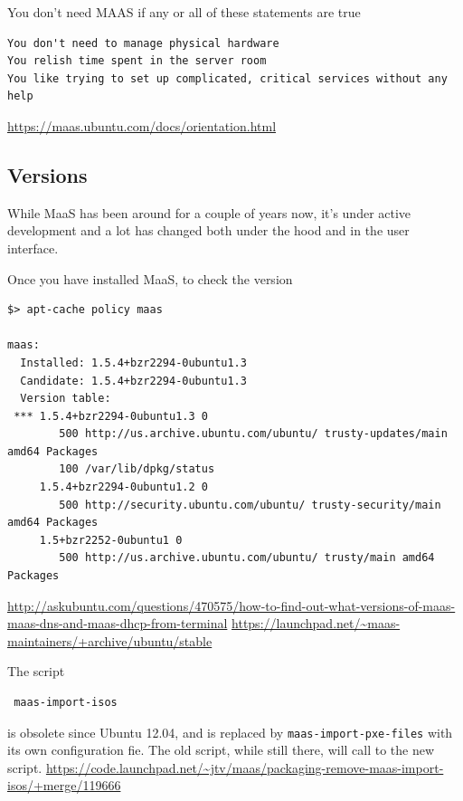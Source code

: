 You don't need MAAS if any or all of these statements are true
\begin{verbatim}
You don't need to manage physical hardware
You relish time spent in the server room
You like trying to set up complicated, critical services without any help
\end{verbatim}
\url{https://maas.ubuntu.com/docs/orientation.html}

\subsection{Versions}
\label{sec:MaaS_version}

While MaaS has been around for a couple of years now, it's under active
development and a lot has changed both under the hood and in the user
interface.  

Once you have installed MaaS, to check the version
\begin{verbatim}
$> apt-cache policy maas

maas:
  Installed: 1.5.4+bzr2294-0ubuntu1.3
  Candidate: 1.5.4+bzr2294-0ubuntu1.3
  Version table:
 *** 1.5.4+bzr2294-0ubuntu1.3 0
        500 http://us.archive.ubuntu.com/ubuntu/ trusty-updates/main amd64 Packages
        100 /var/lib/dpkg/status
     1.5.4+bzr2294-0ubuntu1.2 0
        500 http://security.ubuntu.com/ubuntu/ trusty-security/main amd64 Packages
     1.5+bzr2252-0ubuntu1 0
        500 http://us.archive.ubuntu.com/ubuntu/ trusty/main amd64 Packages

\end{verbatim}
\url{http://askubuntu.com/questions/470575/how-to-find-out-what-versions-of-maas-maas-dns-and-maas-dhcp-from-terminal}
\url{https://launchpad.net/~maas-maintainers/+archive/ubuntu/stable}

The script
\begin{verbatim}
 maas-import-isos
\end{verbatim}
is obsolete since Ubuntu 12.04, and is replaced by \verb!maas-import-pxe-files!
with its own configuration fie. The old script, while still there, will call to
the new script.
\url{https://code.launchpad.net/~jtv/maas/packaging-remove-maas-import-isos/+merge/119666}

